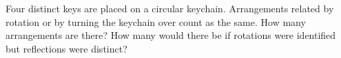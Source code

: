 Four distinct keys are placed on a circular keychain. Arrangements related by rotation or by turning the keychain over count as the same. How many arrangements are there? How many would there be if rotations were identified but reflections were distinct?
